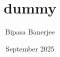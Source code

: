 \documentclass{article}
\title{dummy}
\author{Bipasa Banerjee}
\date{September 2025}
\begin{document}
\maketitle

\begin{table}
    \centering

    {}

    
\end{table}
\end{document}
